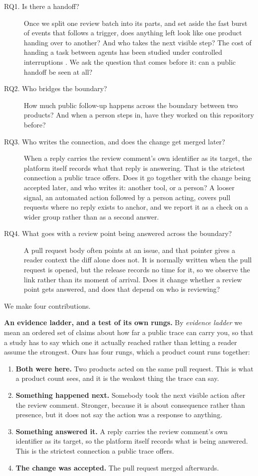 \documentclass[lineno,pdflatex,sn-basic]{sn-jnl}
\begin{document}
\begin{description}
\item[RQ1. Is there a handoff?] Once we split one review batch into its parts,
and set aside the fast burst of events that follows a trigger, does anything
left look like one product handing over to another? And who takes the next
visible step? The cost of handing a task between agents has been studied under
controlled interruptions \citep{kc2026handoff}. We ask the question that comes
before it: can a public handoff be seen at all?
\item[RQ2. Who bridges the boundary?] How much public follow-up happens across
the boundary between two products? And when a person steps in, have they worked
on this repository before?
\item[RQ3. Who writes the connection, and does the change get merged later?]
When a reply carries the review comment's own identifier as its target, the
platform itself records what that reply is answering. That is the strictest
connection a public trace offers. Does it go together with the change being
accepted later, and who writes it: another tool, or a person? A looser signal,
an automated action followed by a person acting, covers pull requests where no
reply exists to anchor, and we report it as a check on a wider group rather than
as a second answer.
\item[RQ4. What goes with a review point being answered across the boundary?] A pull request
body often points at an issue, and that pointer gives a reader context the diff
alone does not. It is normally written when the pull request is opened, but the
release records no time for it, so we observe the link rather than its moment of
arrival. Does it change whether a
review point gets answered, and does that depend on who is reviewing?
\end{description}

We make four contributions.

\textbf{An evidence ladder, and a test of its own rungs.} By \emph{evidence
ladder} we mean an ordered set of claims about how far a public trace can carry
you, so that a study has to say which one it actually reached rather than letting
a reader assume the strongest. Ours has four rungs, which a product count runs
together:

\begin{enumerate}
\item \textbf{Both were here.} Two products acted on the same pull request. This
is what a product count sees, and it is the weakest thing the trace can say.
\item \textbf{Something happened next.} Somebody took the next visible action
after the review comment. Stronger, because it is about consequence rather than
presence, but it does not say the action was a response to anything.
\item \textbf{Something answered it.} A reply carries the review comment's own
identifier as its target, so the platform itself records what is being answered.
This is the strictest connection a public trace offers.
\item \textbf{The change was accepted.} The pull request merged afterwards.
\end{enumerate}
\end{document}

